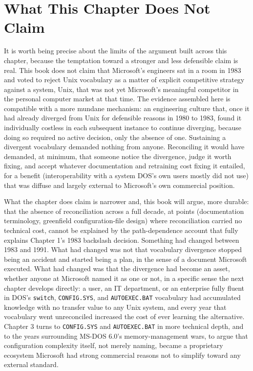 \documentclass[11pt]{book}
\begin{document}
\section{What This Chapter Does Not Claim}

It is worth being precise about the limits of the argument built across this chapter, because the temptation toward a stronger and less defensible claim is real. This book does not claim that Microsoft's engineers sat in a room in 1983 and voted to reject Unix vocabulary as a matter of explicit competitive strategy against a system, Unix, that was not yet Microsoft's meaningful competitor in the personal computer market at that time. The evidence assembled here is compatible with a more mundane mechanism: an engineering culture that, once it had already diverged from Unix for defensible reasons in 1980 to 1983, found it individually costless in each subsequent instance to continue diverging, because doing so required no active decision, only the absence of one. Sustaining a divergent vocabulary demanded nothing from anyone. Reconciling it would have demanded, at minimum, that someone notice the divergence, judge it worth fixing, and accept whatever documentation and retraining cost fixing it entailed, for a benefit (interoperability with a system DOS's own users mostly did not use) that was diffuse and largely external to Microsoft's own commercial position.

What the chapter does claim is narrower and, this book will argue, more durable: that the absence of reconciliation across a full decade, at points (documentation terminology, greenfield configuration-file design) where reconciliation carried no technical cost, cannot be explained by the path-dependence account that fully explains Chapter 1's 1983 backslash decision. Something had changed between 1983 and 1991. What had changed was not that vocabulary divergence stopped being an accident and started being a plan, in the sense of a document Microsoft executed. What had changed was that the divergence had become an asset, whether anyone at Microsoft named it as one or not, in a specific sense the next chapter develops directly: a user, an IT department, or an enterprise fully fluent in DOS's \texttt{switch}, \texttt{CONFIG.SYS}, and \texttt{AUTOEXEC.BAT} vocabulary had accumulated knowledge with no transfer value to any Unix system, and every year that vocabulary went unreconciled increased the cost of ever learning the alternative. Chapter 3 turns to \texttt{CONFIG.SYS} and \texttt{AUTOEXEC.BAT} in more technical depth, and to the years surrounding MS-DOS 6.0's memory-management wars, to argue that configuration complexity itself, not merely naming, became a proprietary ecosystem Microsoft had strong commercial reasons not to simplify toward any external standard.
\end{document}
